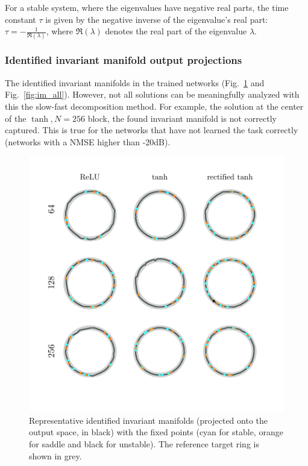 \documentclass{article} %
\newcounter{ct}
\theoremstyle{definition}
\theoremstyle{remark}
\begin{document}
For a stable system, where the eigenvalues have negative real parts, the time constant \(\tau\) is given by the negative inverse of the eigenvalue’s real part: \(\tau = -\frac{1}{\Re(\lambda)}\),
where \(\Re(\lambda)\) denotes the real part of the eigenvalue \(\lambda\).




\newpage
 \subsubsection{Identified invariant manifold output projections}\label{sec:inv_man_projections}
 The identified invariant manifolds in the trained networks (Fig.~\ref{fig:im_rep} and Fig.~\ref{fig:im_all}).
 However, not all solutions can be meaningfully analyzed with this the slow-fast decomposition method.
 For example, the solution at the center of the \(\tanh, N=256\) block, the found invariant manifold is not correctly captured.
 This is true for the networks that have not learned the task correctly (networks with a NMSE higher than -20dB).
 
 \begin{figure}[tbhp]
     \centering
    \includegraphics[width=\textwidth]{im_all_last2}
       \caption{Representative identified invariant manifolds (projected onto the output space, in black) with the fixed points (cyan for stable, orange for saddle and black for unstable).
        The reference target ring is shown in grey.}
       \label{fig:im_rep}
\end{figure}
\end{document}
